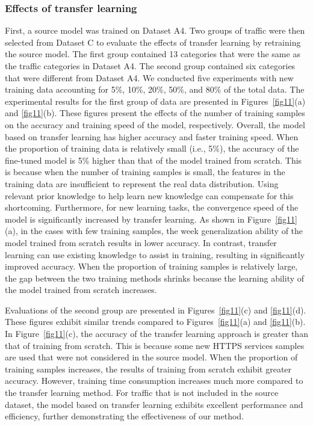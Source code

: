\documentclass[preprint,12pt]{elsarticle}
\begin{document}
\subsubsection{Effects of transfer learning} 
First, a source model was trained on Dataset A4. Two groups of traffic were then selected from Dataset C to evaluate the effects of transfer learning by retraining the source model. The first group contained 13 categories that were the same as the traffic categories in Dataset A4. The second group contained six categories that were different from Dataset A4. We conducted five experiments with new training data accounting for 5\%, 10\%, 20\%, 50\%, and 80\% of the total data. The experimental results for the first group of data are presented in Figures~\ref{fig11}(a) and \ref{fig11}(b). These figures present the effects of the number of training samples on the accuracy and training speed of the model, respectively. 
Overall, the model based on transfer learning has higher accuracy and faster training speed. When the proportion of training data is relatively small (i.e., 5\%), the accuracy of the fine-tuned model is 5\% higher than that of the model trained from scratch. This is because when the number of training samples is small, the features in the training data are insufficient to represent the real data distribution. Using relevant prior knowledge to help learn new knowledge can compensate for this shortcoming. Furthermore, for new learning tasks, the convergence speed of the model is significantly increased by transfer learning. As shown in Figure~\ref{fig11}(a), in the cases with few training samples, the week generalization ability of the model trained from scratch results in lower accuracy. In contrast, transfer learning can use existing knowledge to assist in training, resulting in significantly improved accuracy. When the proportion of training samples is relatively large, the gap between the two training methods shrinks because the learning ability of the model trained from scratch increases. 

Evaluations of the second group are presented in Figures~\ref{fig11}(c) and \ref{fig11}(d). These figures exhibit similar trends compared to Figures~\ref{fig11}(a) and \ref{fig11}(b). In Figure~\ref{fig11}(c), the accuracy of the transfer learning approach is greater than that of training from scratch. This is because some new HTTPS services samples are used that were not considered in the source model. When the proportion of training samples increases, the results of training from scratch exhibit greater accuracy. However, training time consumption increases much more compared to the transfer learning method. For traffic that is not included in the source dataset, the model based on transfer learning exhibits excellent performance and efficiency, further demonstrating the effectiveness of our method.
\end{document}
